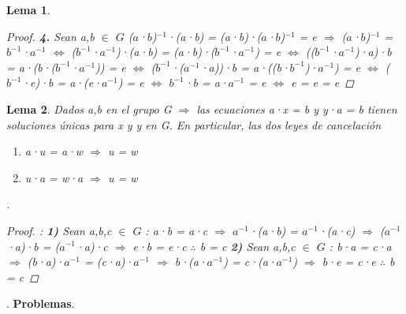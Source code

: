 \documentclass[10pt,a4paper,oneside]{article}
\newtheorem{lem}{Lema}[section]
\begin{document}
\begin{lem}
\begin{proof}
						\newline
						\newline
						\textbf{4.} Sean a,b $\in$ $G$
						\newline
						($a$·$b$)$^{-1}$·(a·b) = (a·b)·($a$·$b$)$^{-1}$ = e $\Rightarrow$ ($a$·$b$)$^{-1}$ = $b^{-1}$·$a^{-1}$ $\iff$ ($b^{-1}$·$a^{-1}$)·(a·b) = (a·b)·($b^{-1}$·$a^{-1}$) = e $\iff$ (($b^{-1}$·$a^{-1}$)·a)·b = a·(b·($b^{-1}$·$a^{-1}$)) = e $\iff$ ($b^{-1}$·($a^{-1}$·a))·b = a·((b·$b^{-1}$)·$a^{-1}$) = e $\iff$ ($b^{-1}$·e)·b = a·(e·$a^{-1}$) = e $\iff$ $b^{-1}$·b = a·$a^{-1}$ = e $\iff$ e = e = e
					\end{proof}
				\end{lem}
				\begin{lem} Dados a,b en el grupo G $\Rightarrow$ las ecuaciones a·x = b y y·a = b tienen soluciones únicas para x y y en G. En particular, las dos leyes de cancelación
					\begin{enumerate}[1)]
						\item a·u = a·w $\Rightarrow$ u = w
						\item u·a = w·a $\Rightarrow$ u = w
					\end{enumerate}.
					\newline
					\begin{proof}:
						\newline
						\textbf{1)} Sean a,b,c $\in$ $G$ : a·b = a·c $\Rightarrow$ $a^{-1}$·(a·b) = $a^{-1}$·(a·c) $\Rightarrow$ ($a^{-1}$·a)·b = ($a^{-1}$·a)·c $\Rightarrow$ e·b = e·c $\therefore$ b = c
						\newline
						\newline
						\textbf{2)} Sean a,b,c $\in$ $G$ : b·a = c·a $\Rightarrow$ (b·a)·$a^{-1}$ = (c·a)·$a^{-1}$ $\Rightarrow$ b·(a·$a^{-1}$) = c·(a·$a^{-1}$) $\Rightarrow$ b·e = c·e $\therefore$ b = c
					\end{proof}
				\end{lem}.
				\newline
				\newline
				\textbf{Problemas}.
				\newline
\end{document}
